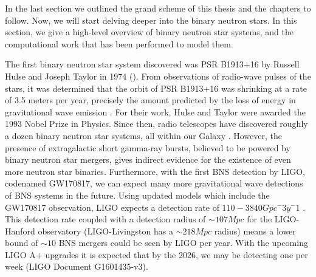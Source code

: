 


In the last section we outlined the grand scheme of this thesis and the chapters to follow. Now, we will start delving deeper into the binary neutron stars. In this section, we give a high-level overview of binary neutron star systems, and the computational work that has been performed to model them. 


The first binary neutron star system discovered was PSR B1913+16 by Russell Hulse and Joseph Taylor in 1974 (\cite{hulse:1975uf}). From observations of radio-wave pulses of the stars, it was determined that the orbit of PSR B1913+16 was shrinking at a rate of 3.5 meters per year, precisely the amount predicted by the loss of energy in gravitational wave emission \cite{1981sciam.245...74w}. For their work, Hulse and Taylor were awarded the 1993 Nobel Prize in Physics. Since then, radio telescopes have discovered roughly a dozen binary neutron star systems, all within our Galaxy \cite{baiottireview2016}. However, the presence of extragalactic short gamma-ray bursts, believed to be powered by binary neutron star mergers, gives indirect evidence for the existence of even more neutron star binaries. Furthermore, with the first BNS detection by LIGO, codenamed GW170817, we can expect many more gravitational wave detections of BNS systems in the future. Using updated models which include the GW170817 observation, LIGO expects a detection rate of $110-3840 Gpc^-3 y^-1$ \cite{ligo2018gwtc}. This detection rate coupled with a detection radius of $\sim 107 Mpc$ for the LIGO-Hanford observatory (LIGO-Livingston has a $\sim 218 Mpc$ radius) \cite{abbott2017gw170817} means a lower bound of $\sim 10$ BNS mergers could be seen by LIGO per year. With the upcoming LIGO A+ upgrades it is expected that by the 2026, we may be detecting one per week (LIGO Document G1601435-v3).

